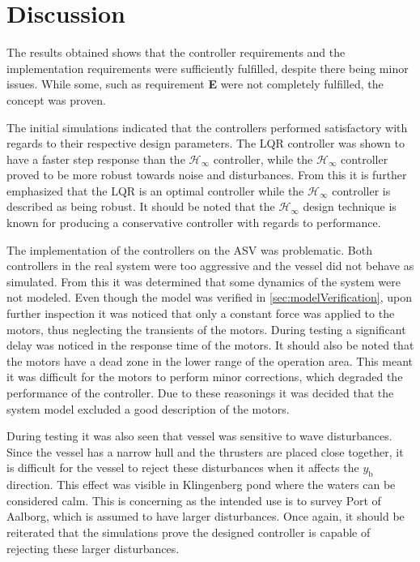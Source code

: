 \chapter{Discussion}\label{chap:discussion}

The results obtained shows that the controller requirements and the implementation requirements were sufficiently fulfilled, despite there being minor issues. While some, such as requirement \textbf{E} were not completely fulfilled, the concept was proven.

The initial simulations indicated that the controllers performed satisfactory with regards to their respective design parameters. The LQR controller was shown to have a faster step response than the $\mathcal{H}_\infty$ controller, while the $\mathcal{H}_\infty$ controller proved to be more robust towards noise and disturbances. From this it is further emphasized that the LQR is an optimal controller while the $\mathcal{H}_\infty$ controller is described as being robust. It should be noted that the $\mathcal{H}_\infty$ design technique is known for producing a conservative controller with regards to performance.

The implementation of the controllers on the ASV was problematic. Both controllers in the real system were too aggressive and the vessel did not behave as simulated. From this it was determined that some dynamics of the system were not modeled. Even though the model was verified in \autoref{sec:modelVerification}, upon further inspection it was noticed that only a constant force was applied to the motors, thus neglecting the transients of the motors. During testing a significant delay was noticed in the response time of the motors. It should also be noted that the motors have a dead zone in the lower range of the operation area. This meant it was difficult for the motors to perform minor corrections, which degraded the performance of the controller. Due to these reasonings it was decided that the system model excluded a good description of the motors. 

During testing it was also seen that vessel was sensitive to wave disturbances. Since the vessel has a narrow hull and the thrusters are placed close together, it is difficult for the vessel to reject these disturbances when it affects the $y_\mathrm{b}$ direction. This effect was visible in Klingenberg pond where the waters can be considered calm. This is concerning as the intended use is to survey Port of Aalborg, which is assumed to have larger disturbances. Once again, it should be reiterated that the simulations prove the designed controller is capable of rejecting these larger disturbances.

